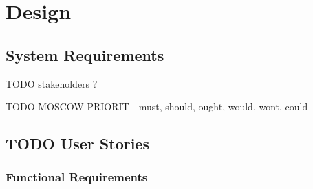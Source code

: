 \documentclass[a4paper,11pt]{article}
\begin{document}
\newpage
\section{Design}

\newpage
\subsection{System Requirements}

TODO stakeholders ?

TODO MOSCOW PRIORIT - must, should, ought, would, wont, could

\subsection{TODO User Stories}

\newpage
\subsubsection{Functional Requirements}
\end{document}

